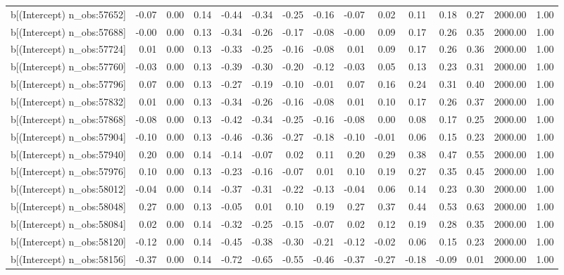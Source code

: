 \begin{table}[ht]
\begin{tabular}{rrrrrrrrrrrrrrr}
  b[(Intercept) n\_obs:57652] & -0.07 & 0.00 & 0.14 & -0.44 & -0.34 & -0.25 & -0.16 & -0.07 & 0.02 & 0.11 & 0.18 & 0.27 & 2000.00 & 1.00 \\ 
  b[(Intercept) n\_obs:57688] & -0.00 & 0.00 & 0.13 & -0.34 & -0.26 & -0.17 & -0.08 & -0.00 & 0.09 & 0.17 & 0.26 & 0.35 & 2000.00 & 1.00 \\ 
  b[(Intercept) n\_obs:57724] & 0.01 & 0.00 & 0.13 & -0.33 & -0.25 & -0.16 & -0.08 & 0.01 & 0.09 & 0.17 & 0.26 & 0.36 & 2000.00 & 1.00 \\ 
  b[(Intercept) n\_obs:57760] & -0.03 & 0.00 & 0.13 & -0.39 & -0.30 & -0.20 & -0.12 & -0.03 & 0.05 & 0.13 & 0.23 & 0.31 & 2000.00 & 1.00 \\ 
  b[(Intercept) n\_obs:57796] & 0.07 & 0.00 & 0.13 & -0.27 & -0.19 & -0.10 & -0.01 & 0.07 & 0.16 & 0.24 & 0.31 & 0.40 & 2000.00 & 1.00 \\ 
  b[(Intercept) n\_obs:57832] & 0.01 & 0.00 & 0.13 & -0.34 & -0.26 & -0.16 & -0.08 & 0.01 & 0.10 & 0.17 & 0.26 & 0.37 & 2000.00 & 1.00 \\ 
  b[(Intercept) n\_obs:57868] & -0.08 & 0.00 & 0.13 & -0.42 & -0.34 & -0.25 & -0.16 & -0.08 & 0.00 & 0.08 & 0.17 & 0.25 & 2000.00 & 1.00 \\ 
  b[(Intercept) n\_obs:57904] & -0.10 & 0.00 & 0.13 & -0.46 & -0.36 & -0.27 & -0.18 & -0.10 & -0.01 & 0.06 & 0.15 & 0.23 & 2000.00 & 1.00 \\ 
  b[(Intercept) n\_obs:57940] & 0.20 & 0.00 & 0.14 & -0.14 & -0.07 & 0.02 & 0.11 & 0.20 & 0.29 & 0.38 & 0.47 & 0.55 & 2000.00 & 1.00 \\ 
  b[(Intercept) n\_obs:57976] & 0.10 & 0.00 & 0.13 & -0.23 & -0.16 & -0.07 & 0.01 & 0.10 & 0.19 & 0.27 & 0.35 & 0.45 & 2000.00 & 1.00 \\ 
  b[(Intercept) n\_obs:58012] & -0.04 & 0.00 & 0.14 & -0.37 & -0.31 & -0.22 & -0.13 & -0.04 & 0.06 & 0.14 & 0.23 & 0.30 & 2000.00 & 1.00 \\ 
  b[(Intercept) n\_obs:58048] & 0.27 & 0.00 & 0.13 & -0.05 & 0.01 & 0.10 & 0.19 & 0.27 & 0.37 & 0.44 & 0.53 & 0.63 & 2000.00 & 1.00 \\ 
  b[(Intercept) n\_obs:58084] & 0.02 & 0.00 & 0.14 & -0.32 & -0.25 & -0.15 & -0.07 & 0.02 & 0.12 & 0.19 & 0.28 & 0.35 & 2000.00 & 1.00 \\ 
  b[(Intercept) n\_obs:58120] & -0.12 & 0.00 & 0.14 & -0.45 & -0.38 & -0.30 & -0.21 & -0.12 & -0.02 & 0.06 & 0.15 & 0.23 & 2000.00 & 1.00 \\ 
  b[(Intercept) n\_obs:58156] & -0.37 & 0.00 & 0.14 & -0.72 & -0.65 & -0.55 & -0.46 & -0.37 & -0.27 & -0.18 & -0.09 & 0.01 & 2000.00 & 1.00 \\ 

\end{tabular}
\end{table}
